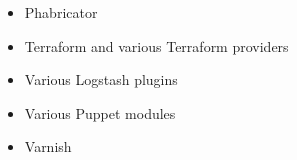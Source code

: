 \begin{itemize}
\item Phabricator
\item Terraform and various Terraform providers
\item Various Logstash plugins
\item Various Puppet modules
\item Varnish
\end{itemize}
